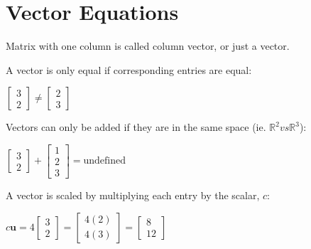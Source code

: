 \documentclass{report}
\begin{document}
\section{Vector Equations}
\begin{definition}
	Matrix with one column is called column vector, or just a vector.
\end{definition}
\begin{definition}
	A vector is only equal if corresponding entries are equal:
	\begin{center}
		$\begin{bmatrix} 3 \\ 2 \end{bmatrix} \neq \begin{bmatrix} 2 \\ 3 \end{bmatrix}$
	\end{center}
	Vectors can only be added if they are in the same space (ie. $\mathbb{R}^2 vs \mathbb{R}^3$):
	\begin{center}
		$\begin{bmatrix} 3 \\ 2 \end{bmatrix} + \begin{bmatrix} 1 \\ 2 \\ 3 \end{bmatrix} = \text{undefined}$
	\end{center}
	A vector is scaled by multiplying each entry by the scalar, $c$:
	\begin{center}
		$c\mathbf{u} = 4\begin{bmatrix} 3 \\ 2 \end{bmatrix} = \begin{bmatrix} 4(2) \\ 4(3) \end{bmatrix}= \begin{bmatrix} 8 \\ 12 \end{bmatrix}$
	\end{center}
\end{definition}
\end{document}
